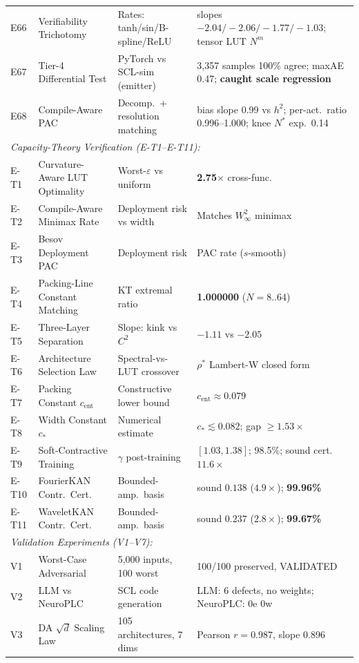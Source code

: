 \documentclass[journal,onecolumn]{IEEEtran}
\begin{document}
\begin{table}[tb]
\begin{tabular}{@{}p{0.7cm}p{4.6cm}p{3.6cm}p{4.9cm}@{}}
E66& Verifiability Trichotomy  & Rates: tanh/sin/B-spline/ReLU & slopes $-2.04/-2.06/-1.77/-1.03$; tensor LUT $N^m$ \\
E67& Tier-4 Differential Test  & PyTorch vs SCL-sim (emitter) & 3{,}357 samples 100\% agree; maxAE 0.47; \textbf{caught scale regression} \\
E68& Compile-Aware PAC         & Decomp.\ + resolution matching & bias slope 0.99 vs $h^2$; per-act.\ ratio 0.996--1.000; knee $N^{*}$ exp.\ 0.14 \\
\midrule
\multicolumn{4}{l}{\textit{Capacity-Theory Verification (E-T1--E-T11):}} \\
E-T1 & Curvature-Aware LUT Optimality & Worst-$\varepsilon$ vs uniform & \textbf{2.75$\times$} cross-func. \\
E-T2 & Compile-Aware Minimax Rate & Deployment risk vs width & Matches $W^2_\infty$ minimax \\
E-T3 & Besov Deployment PAC & Deployment risk & PAC rate ($s$-smooth) \\
E-T4 & Packing-Line Constant Matching & KT extremal ratio & \textbf{1.000000} ($N{=}8..64$) \\
E-T5 & Three-Layer Separation & Slope: kink vs $C^2$ & $-1.11$ vs $-2.05$ \\
E-T6 & Architecture Selection Law & Spectral-vs-LUT crossover & $\rho^*$ Lambert-W closed form \\
E-T7 & Packing Constant $c_{\text{ent}}$ & Constructive lower bound & $c_{\text{ent}} \approx 0.079$ \\
E-T8 & Width Constant $c_*$ & Numerical estimate & $c_* \lesssim 0.082$; gap $\geq 1.53\times$ \\
E-T9 & Soft-Contractive Training & $\gamma$ post-training & $[1.03,1.38]$; 98.5\%; sound cert.\ $11.6\times$ \\
E-T10 & FourierKAN Contr.\ Cert. & Bounded-amp.\ basis & sound $0.138$ ($4.9\times$); \textbf{99.96\%} \\
E-T11 & WaveletKAN Contr.\ Cert. & Bounded-amp.\ basis & sound $0.237$ ($2.8\times$); \textbf{99.67\%} \\
\midrule
\multicolumn{4}{l}{\textit{Validation Experiments (V1--V7):}} \\
V1 & Worst-Case Adversarial   & 5,000 inputs, 100 worst  & 100/100 preserved, VALIDATED \\
V2 & LLM vs NeuroPLC           & SCL code generation   & LLM: 6 defects, no weights; NeuroPLC: 0e 0w \\
V3 & DA $\sqrt{d}$ Scaling Law & 105 architectures, 7 dims & Pearson $r{=}0.987$, slope 0.896 \\

\end{tabular}
\end{table}
\end{document}
